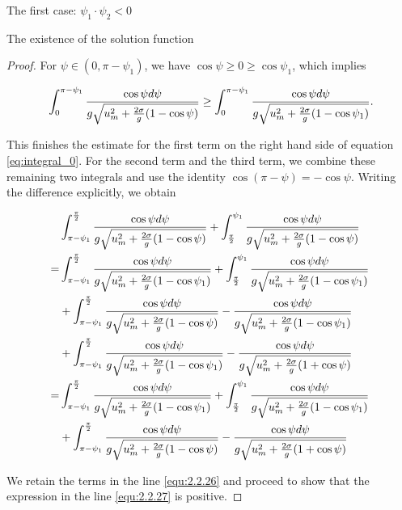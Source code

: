 \documentclass[letterpaper,reqno,10pt,twoside]{amsart}
\theoremstyle{definition}
\theoremstyle{remark}
\begin{document}
\begin{section}{The first case: $\psi_1\cdot \psi_2<0$ }
\begin{subsection}{The existence of the solution function}
\begin{proof}
       \noindent For $\psi\in(0,\pi-\psi_{1})$, we have $\cos\psi\ge0\ge\cos\psi_{1}$, which implies 

        \begin{equation}{\label{equ:2.2.25}}
            \int_{0}^{\pi-\psi_1} \frac{\cos\psi d\psi}{g\sqrt{u_{m}^{2}+\frac{2\sigma}{g}(1-\cos\psi)}}\geq \int_{0}^{\pi-\psi_1} \frac{\cos\psi d\psi}{g\sqrt{u_{m}^{2}+\frac{2\sigma}{g}(1-\cos\psi_1)}}.
        \end{equation}

        \noindent This finishes the estimate for the first term on the right hand side of equation \eqref{eq:integral_0}. For the second term and the third term, we combine these remaining two integrals and use the identity $\cos(\pi-\psi)=-\cos\psi$. Writing the difference explicitly, we obtain

        \begin{align}
             &\int_{\pi-\psi_1}^{\frac{\pi}{2}} \frac{\cos\psi d\psi}{g\sqrt{u_{m}^{2}+\frac{2\sigma}{g}(1-\cos\psi)}}+\int_{\frac{\pi}{2}}^{\psi_1} \frac{\cos\psi d\psi}{g\sqrt{u_{m}^{2}+\frac{2\sigma}{g}(1-\cos\psi)}}\notag\\
              =&\int_{\pi-\psi_1}^{\frac{\pi}{2}} \frac{\cos\psi d\psi}{g\sqrt{u_{m}^{2}+\frac{2\sigma}{g}(1-\cos\psi_1)}}+\int_{\frac{\pi}{2}}^{\psi_1} \frac{\cos\psi d\psi}{g\sqrt{u_{m}^{2}+\frac{2\sigma}{g}(1-\cos\psi_1)}}\notag\\
               &+\int_{\pi-\psi_1}^{\frac{\pi}{2}} \frac{\cos\psi d\psi}{g\sqrt{u_{m}^{2}+\frac{2\sigma}{g}(1-\cos\psi)}}-\frac{\cos\psi d\psi}{g\sqrt{u_{m}^{2}+\frac{2\sigma}{g}(1-\cos\psi_1)}}\notag\\
               &+\int_{\pi-\psi_1}^{\frac{\pi}{2}} \frac{\cos\psi d\psi}{g\sqrt{u_{m}^{2}+\frac{2\sigma}{g}(1-\cos\psi_1)}}-\frac{\cos\psi d\psi}{g\sqrt{u_{m}^{2}+\frac{2\sigma}{g}(1+\cos\psi)}}\notag\\
               =&\int_{\pi-\psi_1}^{\frac{\pi}{2}} \frac{\cos\psi d\psi}{g\sqrt{u_{m}^{2}+\frac{2\sigma}{g}(1-\cos\psi_1)}}+\int_{\frac{\pi}{2}}^{\psi_1} \frac{\cos\psi d\psi}{g\sqrt{u_{m}^{2}+\frac{2\sigma}{g}(1-\cos\psi_1)}}\label{equ:2.2.26}\\
                &+\int_{\pi-\psi_1}^{\frac{\pi}{2}} \frac{\cos\psi d\psi}{g\sqrt{u_{m}^{2}+\frac{2\sigma}{g}(1-\cos\psi)}}-\frac{\cos\psi d\psi}{g\sqrt{u_{m}^{2}+\frac{2\sigma}{g}(1+\cos\psi)}} \label{equ:2.2.27}
        \end{align}

        \noindent  We retain the terms in the line \eqref{equ:2.2.26} and proceed to show that the expression in the line \eqref{equ:2.2.27} is positive. 
        

\end{proof}
\end{subsection}
\end{section}
\end{document}
